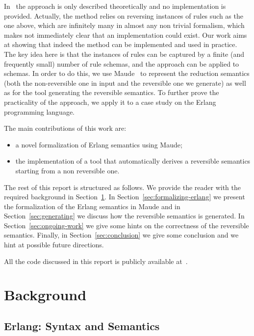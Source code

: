 \documentclass{article}[12pt,a4paper]
\theoremstyle{definition}
\begin{document}
In~\cite{LaneseM20} the approach is only described theoretically and
no implementation is provided. Actually, the method relies on
reversing instances of rules such as the one above, which are infinitely many in almost any
non trivial formalism, which makes not immediately clear that an
implementation could exist. Our work aims at showing that indeed the
method can be implemented and used in practice.  The key idea here is
that the instances of rules can be captured by a finite (and
frequently small) number of rule schemas, and the approach can be
applied to schemas. In order to do this, we use Maude~\cite{maude} to represent the reduction semantics (both the non-reversible one in input and the reversible one we generate) as well as for the tool generating the reversible semantics.
To further prove the practicality of the
approach, we apply it to a case study on the Erlang programming
language.

The main contributions of this work are:
\begin{itemize}
  \item a novel formalization of Erlang semantics using
    Maude;
  \item the implementation of a tool that automatically derives a reversible
    semantics starting from a non reversible one.
\end{itemize}

The rest of this report is structured as follows. We provide the reader with the required
background in Section~\ref{sec:background}. In
Section~\ref{sec:formalizing-erlang} we present the formalization of
the Erlang semantics in Maude and in Section~\ref{sec:generating} we discuss how the reversible semantics
is generated. In Section~\ref{sec:ongoing-work} we give some hints on the correctness of the reversible semantics. Finally, in Section~\ref{sec:conclusion} we give some
conclusion and we hint at possible future directions.

All the code discussed in this report is publicly available
at~\cite{erl-maude-repo}. 

\section{Background}\label{sec:background}

\subsection{Erlang: Syntax and Semantics}
\end{document}
